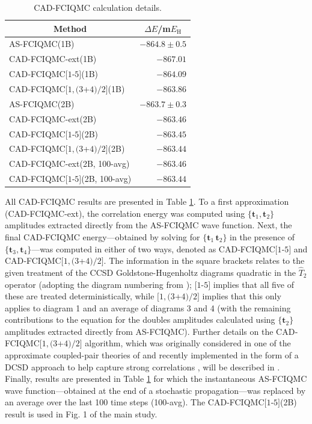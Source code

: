 \documentclass[journal=jcp,manuscript=suppinfo]{achemso}
\begin{document}
%
\begin{table}[ht]
\begin{center}
\caption{CAD-FCIQMC calculation details.}
\label{cad_fciqmc_SI_table}
\begin{tabular}{l|r}
\toprule
\multicolumn{1}{c|}{Method} & \multicolumn{1}{c}{$\Delta E$/m$E_{\text{H}}$} \\
\midrule\midrule
AS-FCIQMC(1B) & $-864.8\pm0.5$ \\
CAD-FCIQMC-ext(1B) & $-867.01$ \\
CAD‐FCIQMC$[1$‐$5]$(1B) & $-864.09$ \\
CAD‐FCIQMC$[1,(3$+$4)/2]$(1B) & $-863.86$ \\
\hline
AS-FCIQMC(2B) & $-863.7\pm0.3$ \\
CAD-FCIQMC-ext(2B) & $-863.46$ \\
CAD‐FCIQMC$[1$‐$5]$(2B) & $-863.45$ \\
CAD‐FCIQMC$[1,(3$+$4)/2]$(2B) & $-863.44$ \\
CAD‐FCIQMC-ext(2B, 100-avg) & $-863.46$ \\
CAD‐FCIQMC$[1$‐$5]$(2B, 100-avg) & $-863.44$ \\
\midrule
\end{tabular}
\vspace{-0.6cm}
\end{center}
\end{table}
%
All CAD-FCIQMC results are presented in Table \ref{cad_fciqmc_SI_table}. To a first approximation (CAD-FCIQMC-ext), the correlation energy was computed using $\{\bm{t}_1,\bm{t}_2\}$ amplitudes extracted directly from the AS-FCIQMC wave function. Next, the final CAD-FCIQMC energy---obtained by solving for $\{\bm{t}_1\,\bm{t}_2\}$ in the presence of $\{\bm{t}_3,\bm{t}_4\}$---was computed in either of two ways, denoted as CAD‐FCIQMC$[1$‐$5]$ and CAD‐FCIQMC$[1,(3$+$4)/2]$. The information in the square brackets relates to the given treatment of the CCSD Goldstone-Hugenholtz diagrams quadratic in the $\hat{T}_2$ operator (adopting the diagram numbering from {\color{red}{Ref. ???}}); $[1$-$5]$ implies that all five of these are treated deterministically, while $[1,(3$+$4)/2]$ implies that this only applies to diagram 1 and an average of diagrams 3 and 4 (with the remaining contributions to the equation for the doubles amplitudes calculated using $\{\bm{t}_2\}$ amplitudes extracted directly from AS-FCIQMC). Further details on the CAD‐FCIQMC$[1,(3$+$4)/2]$ algorithm, which was originally considered in one of the approximate coupled-pair theories of {\color{red}{Ref. ???}} and recently implemented in the form of a DCSD approach to help capture strong correlations {\color{red}{(Ref. ???)}}, will be described in {\color{red}{Ref. ???}}. Finally, results are presented in Table \ref{cad_fciqmc_SI_table} for which the instantaneous AS-FCIQMC wave function---obtained at the end of a stochastic propagation---was replaced by an average over the last 100 time steps (100-avg). The CAD‐FCIQMC$[1$‐$5]$(2B) result is used in Fig. 1 of the main study.
\end{document}
